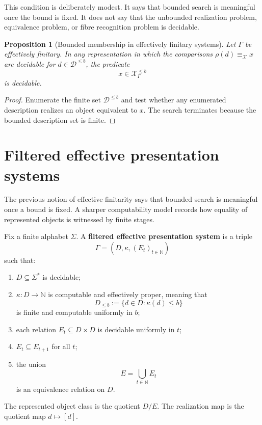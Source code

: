 \documentclass[11pt]{article}
\newtheorem{proposition}[theorem]{Proposition}
\begin{document}
This condition is deliberately modest. It says that bounded search is meaningful once the bound is fixed. It does not say that the unbounded realization problem, equivalence problem, or fibre recognition problem is decidable.

\begin{proposition}[Bounded membership in effectively finitary systems]
Let \(\Gamma\) be effectively finitary. In any representation in which the comparisons \(\rho(d)\equiv_\mathcal X x\) are decidable for \(d\in\mathcal D^{\leq b}\), the predicate
\[
x\in\mathcal X_\Gamma^{\leq b}
\]
is decidable.
\end{proposition}

\begin{proof}
Enumerate the finite set \(\mathcal D^{\leq b}\) and test whether any enumerated description realizes an object equivalent to \(x\). The search terminates because the bounded description set is finite.
\end{proof}


\section{Filtered effective presentation systems}

The previous notion of effective finitarity says that bounded search is meaningful once a bound is fixed.  A sharper computability model records how equality of represented objects is witnessed by finite stages.

Fix a finite alphabet \(\Sigma\).  A \textbf{filtered effective presentation system} is a triple
\[
\Gamma=(D,\kappa,(E_t)_{t\in\mathbb N})
\]
such that:
\begin{enumerate}[label=(\roman*)]
\item \(D\subseteq\Sigma^*\) is decidable;
\item \(\kappa:D\to\mathbb N\) is computable and effectively proper, meaning that
\[
D_{\leq b}:=\{d\in D:\kappa(d)\leq b\}
\]
is finite and computable uniformly in \(b\);
\item each relation \(E_t\subseteq D\times D\) is decidable uniformly in \(t\);
\item \(E_t\subseteq E_{t+1}\) for all \(t\);
\item the union
\[
E=\bigcup_{t\in\mathbb N}E_t
\]
is an equivalence relation on \(D\).
\end{enumerate}
The represented object class is the quotient \(D/E\).  The realization map is the quotient map \(d\mapsto[d]\).
\end{document}
